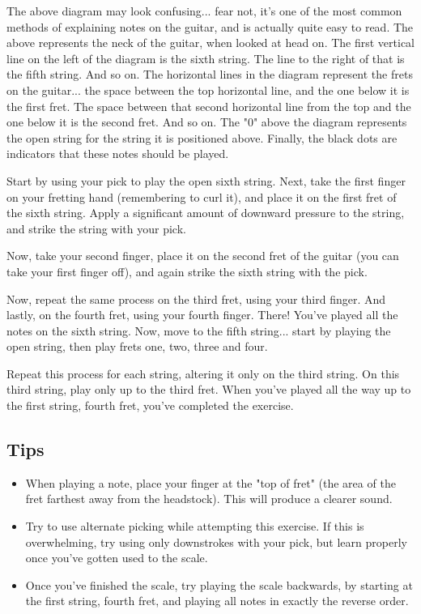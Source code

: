 The above diagram may look confusing... fear not, it's one of the most common
methods of explaining notes on the guitar, and is actually quite easy to read.
The above represents the neck of the guitar, when looked at head on. The first
vertical line on the left of the diagram is the sixth string. The line to the
right of that is the fifth string. And so on. The horizontal lines in the
diagram represent the frets on the guitar... the space between the top
horizontal line, and the one below it is the first fret. The space between that
second horizontal line from the top and the one below it is the second fret.
And so on. The "0" above the diagram represents the open string for the string
it is positioned above. Finally, the black dots are indicators that these notes
should be played.

Start by using your pick to play the open sixth string. Next, take the first
finger on your fretting hand (remembering to curl it), and place it on the
first fret of the sixth string. Apply a significant amount of downward pressure
to the string, and strike the string with your pick.

Now, take your second finger, place it on the second fret of the guitar (you
can take your first finger off), and again strike the sixth string with the
pick.

Now, repeat the same process on the third fret, using your third finger. And
lastly, on the fourth fret, using your fourth finger. There! You've played all
the notes on the sixth string. Now, move to the fifth string... start by
playing the open string, then play frets one, two, three and four.

Repeat this process for each string, altering it only on the third string. On
this third string, play only up to the third fret. When you've played all the
way up to the first string, fourth fret, you've completed the exercise.

\subsection{Tips}
\begin{itemize}
\item When playing a note, place your finger at the "top of fret" (the area of the fret farthest away from the headstock). This will produce a clearer sound.
\item Try to use alternate picking while attempting this exercise. If this is overwhelming, try using only downstrokes with your pick, but learn properly once you've gotten used to the scale.
\item Once you've finished the scale, try playing the scale backwards, by starting at the first string, fourth fret, and playing all notes in exactly the reverse order.
\end{itemize}


